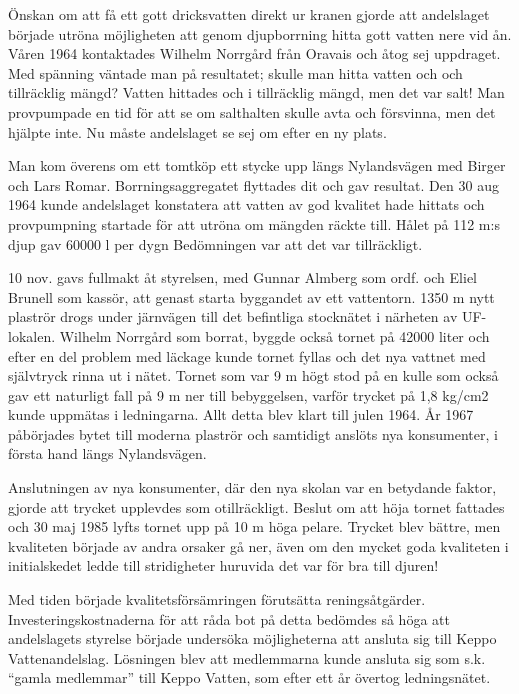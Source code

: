 Önskan om att få ett gott dricksvatten direkt ur kranen gjorde att andelslaget började utröna möjligheten att genom djupborrning hitta gott vatten nere vid ån. Våren 1964 kontaktades Wilhelm Norrgård  från Oravais och åtog sej uppdraget. Med spänning väntade man på  resultatet; skulle man hitta vatten och och tillräcklig mängd? Vatten hittades och i tillräcklig mängd, men det var salt! Man provpumpade en tid för att se om salthalten skulle avta och försvinna, men det hjälpte inte. Nu måste andelslaget se sej om efter en ny plats.

Man kom överens om ett tomtköp ett stycke upp längs Nylandsvägen med Birger och Lars Romar. Borrningsaggregatet flyttades dit och gav resultat. Den 30 aug 1964 kunde andelslaget konstatera att vatten av god kvalitet hade hittats och provpumpning startade för att utröna om mängden räckte till. Hålet på 112 m:s djup gav 60000 l per dygn Bedömningen var att det var tillräckligt.

10 nov. gavs fullmakt åt styrelsen, med Gunnar Almberg som ordf. och Eliel Brunell som kassör, att genast starta byggandet av ett vattentorn. 1350 m nytt plaströr drogs under järnvägen till det befintliga stocknätet i närheten av UF-lokalen. Wilhelm Norrgård som borrat, byggde också tornet på 42000 liter och efter en del problem med läckage kunde tornet fyllas och det nya vattnet med självtryck rinna ut i nätet. Tornet som var 9 m högt stod på en kulle som också gav ett naturligt fall på 9 m ner till bebyggelsen, varför trycket på 1,8 kg/cm2 kunde uppmätas i ledningarna. Allt detta blev klart till julen 1964. År 1967 påbörjades bytet till moderna plaströr och samtidigt anslöts nya konsumenter, i första hand längs Nylandsvägen.

Anslutningen av nya konsumenter, där den nya  skolan var en betydande faktor, gjorde att trycket upplevdes som otillräckligt. Beslut om att höja tornet fattades och 30 maj 1985 lyfts tornet upp på 10 m höga pelare. Trycket blev bättre, men kvaliteten började av andra orsaker gå ner, även om den mycket goda kvaliteten i initialskedet ledde till stridigheter huruvida det var för bra till djuren!

Med tiden började kvalitetsförsämringen förutsätta reningsåtgärder. Investeringskostnaderna för att råda bot på detta bedömdes så höga att andelslagets styrelse började undersöka möjligheterna att ansluta sig till Keppo Vattenandelslag. Lösningen blev att medlemmarna kunde ansluta sig som s.k. ``gamla medlemmar'' till Keppo Vatten, som efter ett år övertog ledningsnätet.

